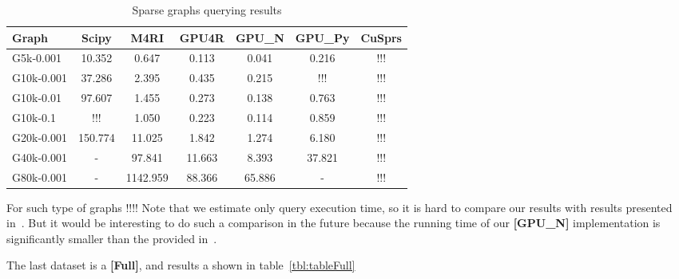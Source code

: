 {\setlength{\tabcolsep}{0.4em}
\begin{table}[H]
\caption{Sparse graphs querying results}
\label{tbl:tableSparse}
\begin{tabular}{| l | c | c | c | c | c | c | }
    \hline
    Graph              & Scipy   & M4RI     & GPU4R  & GPU\_N & GPU\_Py & CuSprs  \\
    \hline
    \hline
    \small{G5k-0.001}  & 10.352  & 0.647    & 0.113  & 0.041  & 0.216   & !!!     \\
    \small{G10k-0.001} & 37.286  & 2.395    & 0.435  & 0.215  & !!!     & !!!     \\
    \small{G10k-0.01}  & 97.607  & 1.455    & 0.273  & 0.138  & 0.763   & !!!     \\
    \small{G10k-0.1}   & !!!     & 1.050    & 0.223  & 0.114  & 0.859   & !!!     \\
    \small{G20k-0.001} & 150.774 & 11.025   & 1.842  & 1.274  & 6.180   & !!!     \\
    \small{G40k-0.001} & -       & 97.841   & 11.663 & 8.393  & 37.821  & !!!     \\
    \small{G80k-0.001} & -       & 1142.959 & 88.366 & 65.886 & -       & !!!     \\
    \hline
  \end{tabular}
\end{table}
}


For such type of graphs !!!!
Note that we estimate only query execution time, so it is hard to compare our results with results presented in~\cite{fan2018scaling}.
But it would be interesting to do such a comparison in the future because the running time of our \textbf{[GPU\_N]} implementation is significantly smaller than the provided in~\cite{fan2018scaling}.

The last dataset is a \textbf{[Full]}, and results a shown in table~\ref{tbl:tableFull}


